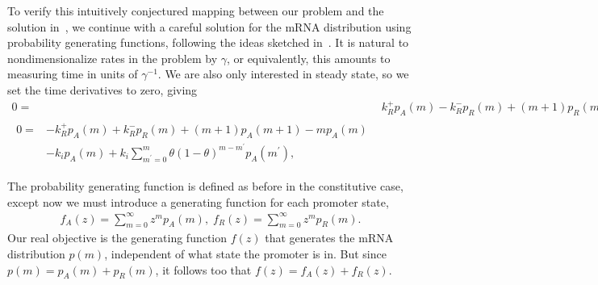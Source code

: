 \documentclass[12pt]{article}%
\begin{document}
To verify this intuitively conjectured mapping between our problem and
the solution in~\cite{Shahrezaei2008}, we continue with a careful
solution for the mRNA distribution using probability generating functions,
following the ideas sketched in~\cite{Shahrezaei2008}.
It is natural to nondimensionalize rates in the problem by $\gamma$,
or equivalently, this amounts to measuring time in units of $\gamma^{-1}$.
We are also only interested in steady state, so we set the time
derivatives to zero, giving
\begin{align}
0 =& k_R^+ p_A(m) - k_R^- p_R(m) + (m+1) p_R(m+1) - m p_R(m)
\\
\begin{split}
0 =& - k_R^+ p_A(m) + k_R^- p_R(m) + (m+1) p_A(m+1) - m p_A(m) 
\\
&- k_i p_A(m) + k_i \sum_{m^\prime=0}^m \theta(1-\theta)^{m-m^\prime} p_A(m^\prime),
\end{split}
\end{align}
        
The probability generating function is defined as before in the
constitutive case, except now we must introduce a generating function
for each promoter state,
\begin{align}
f_A(z) = \sum_{m=0}^\infty z^m p_A(m),
\;
f_R(z) = \sum_{m=0}^\infty z^m p_R(m).
\end{align}
Our real objective is the generating function $f(z)$ that generates
the mRNA distribution $p(m)$, independent of what state the promoter is in.
But since $p(m) = p_A(m) + p_R(m)$, it follows too that $f(z) = f_A(z) + f_R(z)$.
\end{document}
